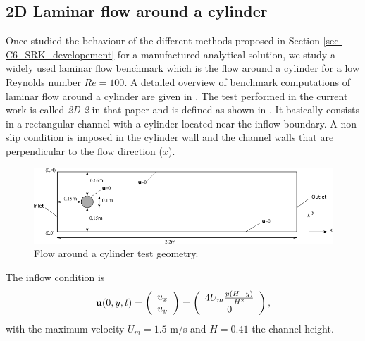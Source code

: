 \subsection{2D Laminar flow around a cylinder}
\label{subsec-C6_cylinder}
Once studied the behaviour of the different methods proposed in Section \ref{sec-C6_SRK_developement} for a manufactured analytical solution, we study a widely used laminar flow benchmark which is the flow around a cylinder for a low Reynolds number $Re=100$. A detailed overview of benchmark computations of laminar flow around a cylinder are given in \cite{schafer_benchmark_1996}. The test performed in the current work is called \textit{2D-2} in that paper and is defined as shown in . It basically consists in a rectangular channel with a cylinder located near the inflow boundary. A non-slip condition is imposed in the cylinder wall and the channel walls that are perpendicular to the flow direction ($x$).
\begin{figure}[h!]
  \centering
  \includegraphics[width=\textwidth]{Figures/Chapter6/geom_2D} 
  \caption{Flow around a cylinder test geometry.}
  \label{fig-Cyl_geom}
\end{figure}
The inflow condition is
$${\bf u}(0,y,t)=\left(\begin{array}{c}
u_x\\
u_y\\
\end{array}\right)=\left(\begin{array}{c}
4U_m\frac{y(H-y)}{H^2}\\
0\\
\end{array}\right),$$
with the maximum velocity $U_m=1.5$ m/s and $H=0.41$ the channel height.

